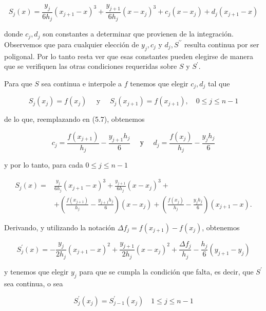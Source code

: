 \documentclass[10pt]{book}
\begin{document}
\begin{equation*}
S_{j}(x)=\frac{y_{j}}{6 h_{j}}\left(x_{j+1}-x\right)^{3}+\frac{y_{j+1}}{6 h_{j}}\left(x-x_{j}\right)^{3}+c_{j}\left(x-x_{j}\right)+d_{j}\left(x_{j+1}-x\right) \tag{5.7}
\end{equation*}


donde $c_{j}, d_{j}$ son constantes a determinar que provienen de la integración.\\
Observemos que para cualquier elección de $y_{j}, c_{j}$ y $d_{j}, S^{\prime \prime}$ resulta continua por ser poligonal. Por lo tanto resta ver que esas constantes pueden elegirse de manera que se verifiquen las otras condiciones requeridas sobre $S$ y $S^{\prime}$.

Para que $S$ sea continua e interpole a $f$ tenemos que elegir $c_{j}, d_{j}$ tal que

$$
S_{j}\left(x_{j}\right)=f\left(x_{j}\right) \quad \text { y } \quad S_{j}\left(x_{j+1}\right)=f\left(x_{j+1}\right), \quad 0 \leq j \leq n-1
$$

de lo que, reemplazando en (5.7), obtenemos

$$
c_{j}=\frac{f\left(x_{j+1}\right)}{h_{j}}-\frac{y_{j+1} h_{j}}{6} \quad \text { у } \quad d_{j}=\frac{f\left(x_{j}\right)}{h_{j}}-\frac{y_{j} h_{j}}{6}
$$

y por lo tanto, para cada $0 \leq j \leq n-1$

$$
\begin{aligned}
S_{j}(x)= & \frac{y_{j}}{6 h_{j}}\left(x_{j+1}-x\right)^{3}+\frac{y_{j+1}}{6 h_{j}}\left(x-x_{j}\right)^{3}+ \\
& +\left(\frac{f\left(x_{j+1}\right)}{h_{j}}-\frac{y_{j+1} h_{j}}{6}\right)\left(x-x_{j}\right)+\left(\frac{f\left(x_{j}\right)}{h_{j}}-\frac{y_{j} h_{j}}{6}\right)\left(x_{j+1}-x\right) .
\end{aligned}
$$

Derivando, y utilizando la notación $\Delta f_{j}=f\left(x_{j+1}\right)-f\left(x_{j}\right)$, obtenemos

$$
S_{j}^{\prime}(x)=-\frac{y_{j}}{2 h_{j}}\left(x_{j+1}-x\right)^{2}+\frac{y_{j+1}}{2 h_{j}}\left(x-x_{j}\right)^{2}+\frac{\Delta f_{j}}{h_{j}}-\frac{h_{j}}{6}\left(y_{j+1}-y_{j}\right)
$$

y tenemos que elegir $y_{j}$ para que se cumpla la condición que falta, es decir, que $S^{\prime}$ sea continua, o sea

$$
S_{j}^{\prime}\left(x_{j}\right)=S_{j-1}^{\prime}\left(x_{j}\right) \quad 1 \leq j \leq n-1
$$
\end{document}

